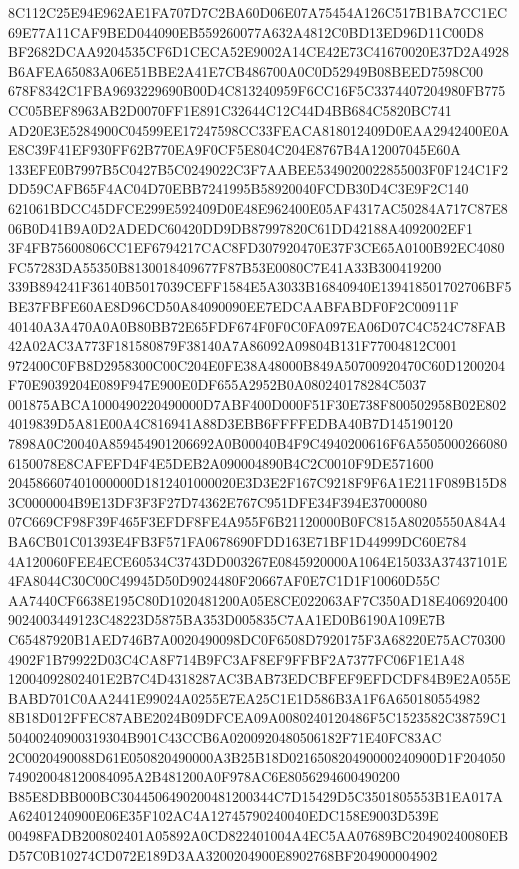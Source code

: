 \documentclass[UTF8,fontset=fandol,zihao=-4,a4paper]{ctexart}
\begin{document}
{{8C112C25E94E962AE1FA707D7C2BA60D06E07A75454A126C517B1BA7CC1EC69E77A11CAF9BED044090EB559260077A632A4812C0BD13ED96D11C00D8
BF2682DCAA9204535CF6D1CECA52E9002A14CE42E73C41670020E37D2A4928B6AFEA65083A06E51BBE2A41E7CB486700A0C0D52949B08BEED7598C00
678F8342C1FBA9693229690B00D4C813240959F6CC16F5C3374407204980FB775CC05BEF8963AB2D0070FF1E891C32644C12C44D4BB684C5820BC741
AD20E3E5284900C04599EE17247598CC33FEACA818012409D0EAA2942400E0AE8C39F41EF930FF62B770EA9F0CF5E804C204E8767B4A12007045E60A
133EFE0B7997B5C0427B5C0249022C3F7AABEE5349020022855003F0F124C1F2DD59CAFB65F4AC04D70EBB7241995B58920040FCDB30D4C3E9F2C140
621061BDCC45DFCE299E592409D0E48E962400E05AF4317AC50284A717C87E806B0D41B9A0D2ADEDC60420DD9DB87997820C61DD42188A4092002EF1
3F4FB75600806CC1EF6794217CAC8FD307920470E37F3CE65A0100B92EC4080FC57283DA55350B8130018409677F87B53E0080C7E41A33B300419200
339B894241F36140B5017039CEFF1584E5A3033B16840940E139418501702706BF5BE37FBFE60AE8D96CD50A84090090EE7EDCAABFABDF0F2C00911F
40140A3A470A0A0B80BB72E65FDF674F0F0C0FA097EA06D07C4C524C78FAB42A02AC3A773F181580879F38140A7A86092A09804B131F77004812C001
972400C0FB8D2958300C00C204E0FE38A48000B849A50700920470C60D1200204F70E9039204E089F947E900E0DF655A2952B0A080240178284C5037
001875ABCA1000490220490000D7ABF400D000F51F30E738F800502958B02E8024019839D5A81E00A4C816941A88D3EBB6FFFFEDBA40B7D145190120
7898A0C20040A859454901206692A0B00040B4F9C4940200616F6A55050002660806150078E8CAFEFD4F4E5DEB2A090004890B4C2C0010F9DE571600
204586607401000000D1812401000020E3D3E2F167C9218F9F6A1E211F089B15D83C0000004B9E13DF3F3F27D74362E767C951DFE34F394E37000080
07C669CF98F39F465F3EFDF8FE4A955F6B21120000B0FC815A80205550A84A4BA6CB01C01393E4FB3F571FA0678690FDD163E71BF1D44999DC60E784
4A120060FEE4ECE60534C3743DD003267E0845920000A1064E15033A37437101E4FA8044C30C00C49945D50D9024480F20667AF0E7C1D1F10060D55C
AA7440CF6638E195C80D1020481200A05E8CE022063AF7C350AD18E4069204009024003449123C48223D5875BA353D005835C7AA1ED0B6190A109E7B
C65487920B1AED746B7A0020490098DC0F6508D7920175F3A68220E75AC703004902F1B79922D03C4CA8F714B9FC3AF8EF9FFBF2A7377FC06F1E1A48
12004092802401E2B7C4D4318287AC3BAB73EDCBFEF9EFDCDF84B9E2A055EBABD701C0AA2441E99024A0255E7EA25C1E1D586B3A1F6A650180554982
8B18D012FFEC87ABE2024B09DFCEA09A0080240120486F5C1523582C38759C150400240900319304B901C43CCB6A0200920480506182F71E40FC83AC
2C0020490088D61E050820490000A3B25B18D021650820490000240900D1F204050749020048120084095A2B481200A0F978AC6E8056294600490200
B85E8DBB000BC3044506490200481200344C7D15429D5C3501805553B1EA017AA62401240900E06E35F102AC4A12745790240040EDC158E9003D539E
00498FADB200802401A05892A0CD822401004A4EC5AA07689BC20490240080EBD57C0B10274CD072E189D3AA3200204900E8902768BF204900004902
}}
\end{document}
